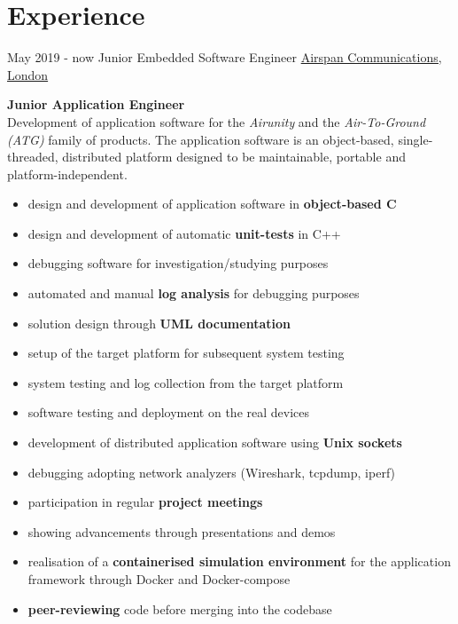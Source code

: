 \documentclass[letterpaper]{twentysecondcv} %
\begin{document}
\makeprofile %
%
%
\section{Experience}

\begin{twenty} %
    \twentyitem
    	{May 2019 -}
		{now}
        {Junior Embedded Software Engineer}
        {\href{https://www.airspan.com/}{Airspan Communications, London}}
        {}
        {
            \textbf{Junior Application Engineer}\\
            Development of application software for the \textit{Airunity} and the \textit{Air-To-Ground (ATG)} family of products. The application software is an object-based, single-threaded, distributed platform designed to be maintainable, portable and platform-independent.
            \begin{itemize}
                \item design and development of application software in \textbf{object-based C}
                \item design and development of automatic \textbf{unit-tests} in C++
                \item debugging software for investigation/studying purposes
                \item automated and manual \textbf{log analysis} for debugging purposes
                \item solution design through \textbf{UML documentation}
                \item setup of the target platform for subsequent system testing
                \item system testing and log collection from the target platform
                \item software testing and deployment on the real devices
                \item development of distributed application software using \textbf{Unix sockets}
                \item debugging adopting network analyzers (Wireshark, tcpdump, iperf)
                \item participation in regular \textbf{project meetings}
                \item showing advancements through presentations and demos
                \item realisation of a \textbf{containerised simulation environment} for the application framework through Docker and Docker-compose
                \item \textbf{peer-reviewing} code before merging into the codebase
            \end{itemize}

}
\end{twenty}
\end{document}
